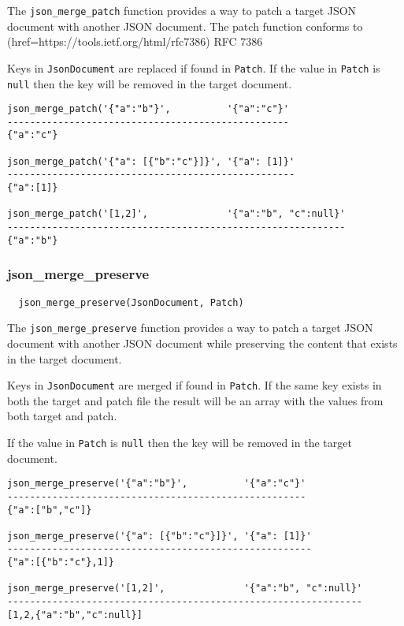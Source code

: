 The \verb`json_merge_patch` function provides a way to patch a target JSON
document with another JSON document.  The patch function conforms to
(href=https://tools.ietf.org/html/rfc7386) RFC 7386

Keys in \verb`JsonDocument` are replaced if found in \verb`Patch`.  If the
value in \verb`Patch` is \verb`null` then the key will be removed in the
target document.

\begin{verbatim}
json_merge_patch('{"a":"b"}',          '{"a":"c"}'
--------------------------------------------------
{"a":"c"}

json_merge_patch('{"a": [{"b":"c"}]}', '{"a": [1]}'
---------------------------------------------------
{"a":[1]}

json_merge_patch('[1,2]',              '{"a":"b", "c":null}'
------------------------------------------------------------
{"a":"b"}
\end{verbatim}

\subsubsection{json\_merge\_preserve}

\begin{verbatim}
  json_merge_preserve(JsonDocument, Patch)
\end{verbatim}

The \verb`json_merge_preserve` function provides a way to patch a target JSON
document with another JSON document while preserving the content that exists
in the target document.

Keys in \verb`JsonDocument` are merged if found in \verb`Patch`.  If the same
key exists in both the target and patch file the result will be an array with
the values from both target and patch.

If the
value in \verb`Patch` is \verb`null` then the key will be removed in the
target document.

\begin{verbatim}
json_merge_preserve('{"a":"b"}',          '{"a":"c"}'
-----------------------------------------------------
{"a":["b","c"]}

json_merge_preserve('{"a": [{"b":"c"}]}', '{"a": [1]}'
------------------------------------------------------
{"a":[{"b":"c"},1]}

json_merge_preserve('[1,2]',              '{"a":"b", "c":null}'
---------------------------------------------------------------
[1,2,{"a":"b","c":null}]

\end{verbatim}


